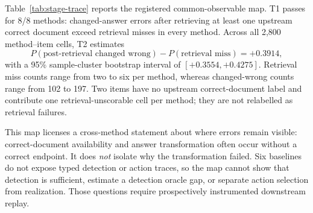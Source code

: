 \documentclass[letterpaper]{article}
\begin{document}
Table~\ref{tab:stage-trace} reports the registered common-observable map. T1 passes for 8/8 methods: changed-answer errors after retrieving at least one
upstream correct document exceed retrieval misses in every method. Across all
2,800 method--item cells, T2 estimates
\[
P(\text{post-retrieval changed wrong})-P(\text{retrieval miss})=+0.3914,
\]
with a 95\% sample-cluster bootstrap interval of $[+0.3554,+0.4275]$.
Retrieval miss counts range from two to six per method, whereas changed-wrong
counts range from 102 to 197. Two items have no upstream correct-document label
and contribute one retrieval-unscorable cell per method; they are not relabelled
as retrieval failures.

\begin{table}[t]
\centering
\small
{}
\caption{Capability-aware observational trace map on 350 upstream-labelled
RAMDocs development items per method. ``Changed'' means citation-stripped,
normalized answer text differs from the shared initial answer; it does not mean
the revision is factually correct.}
\label{tab:stage-trace}
\end{table}

This map licenses a cross-method statement about where errors remain visible:
correct-document availability and answer transformation often occur without a
correct endpoint. It does \emph{not} isolate why the transformation failed.
Six baselines do not expose typed detection or action traces, so the map cannot
show that detection is sufficient, estimate a detection oracle gap, or separate
action selection from realization. Those questions require prospectively
instrumented downstream replay.
\end{document}
